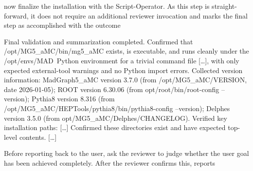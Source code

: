 \documentclass[submission, Phys]{SciPost}
\begin{document}
%
\ma now finalize the installation with the Script-Operator. As this step is straight-forward, it does not require an additional reviewer invocation and \ma marks the final step as accomplished with the outcome
%
\begin{planblock}
Final validation and summarization completed. Confirmed that /opt/MG5\_aMC/bin/mg5\_aMC exists, is executable, and runs cleanly under the /opt/envs/MAD\ Python environment for a trivial command file [\ldots], with only expected external-tool warnings and no Python import errors. Collected version information: MadGraph5\_aMC version 3.7.0 (from /opt/MG5\_aMC/VERSION, date 2026-01-05); ROOT version 6.30.06 (from \/opt/root/bin/root-config --version); Pythia8 version 8.316 (from /opt/MG5\_aMC/HEPTools/pythia8/bin/pythia8-config --version); Delphes version 3.5.0 (from \/opt/MG5\_aMC/Delphes/CHANGELOG). Verified key installation paths: [\ldots] Confirmed these directories exist and have expected top-level contents. [\ldots]
\end{planblock}
%
Before reporting back to the user, \ma ask the reviewer to judge whether the user goal has been achieved completely. After the reviewer confirms this, \ma reports
%
\end{document}
